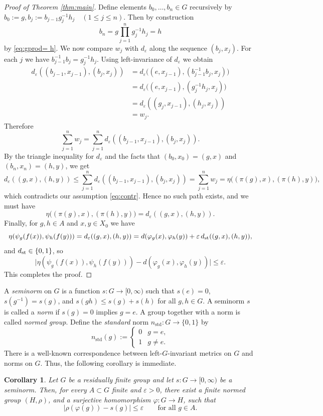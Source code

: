 \documentclass[11pt,a4paper]{amsproc}
\numberwithin{equation}{section}
\newtheorem{corollary}[theorem]{Corollary}
\theoremstyle{definition}
\begin{document}
\begin{proof}[Proof of Theorem \ref{thm:main}]
Define elements $b_0,\dots,b_n\in G$ recursively by
$b_0:=g, b_j := b_{j-1}g_j^{-1}h_j\quad (1\le j\le n).$ Then by construction
\[
b_n = g\prod_{j=1}^n g_j^{-1}h_j = h
\]
by \eqref{eq:gprod= h}. We now compare $w_j$ with $d_\varepsilon$ along the sequence $(b_j,x_j)$. For each $j$ we have
$b_{j-1}^{-1}b_j = g_j^{-1}h_j.$ Using left-invariance of $d_\varepsilon$ we obtain
\begin{align*}
d_\varepsilon((b_{j-1},x_{j-1}),(b_j,x_j))
&= d_\varepsilon\bigl((e,x_{j-1}),(b_{j-1}^{-1}b_j,x_j)\bigr)\\
&= d_\varepsilon\bigl((e,x_{j-1}),(g_j^{-1}h_j,x_j)\bigr)\\
&= d_\varepsilon((g_j,x_{j-1}),(h_j,x_j))\\
&= w_j.
\end{align*}
Therefore
\[
\sum_{j=1}^n w_j
= \sum_{j=1}^n d_\varepsilon((b_{j-1},x_{j-1}),(b_j,x_j)).
\]
By the triangle inequality for $d_\varepsilon$ and the facts that $(b_0,x_0)=(g,x)$ and $(b_n,x_n)=(h,y)$, we get
\[
d_\varepsilon((g,x),(h,y))
\le \sum_{j=1}^n d_\varepsilon((b_{j-1},x_{j-1}),(b_j,x_j))
= \sum_{j=1}^n w_j
= \eta\bigl((\pi(g),x),(\pi(h),y)\bigr),
\]
which contradicts our assumption \eqref{eq:contr}. Hence no such path exists, and we must have
\[
\eta\bigl((\pi(g),x),(\pi(h),y)\bigr)
= d_\varepsilon((g,x),(h,y)).
\]
Finally, for $g,h\in A$ and $x,y\in X_0$ we have
\[
\eta(\psi_g(f(x)),\psi_h(f(y)))
= d_\varepsilon((g,x),(h,y))
= d(\varphi_g(x),\varphi_h(y)) + \varepsilon\, d_{\rm st}((g,x),(h,y)),
\]
and $d_{\rm st}\in\{0,1\}$, so
\[
\bigl|\eta(\psi_g(f(x)),\psi_h(f(y))) - d(\varphi_g(x),\varphi_h(y))\bigr|
\le \varepsilon.
\]
This completes the proof.
\end{proof}

A \emph{seminorm} on $G$ is a function $s\colon G\to[0,\infty)$ such that
$s(e)=0$, $s(g^{-1})=s(g)$, and $s(gh)\le s(g)+s(h)$ for all $g,h\in G$. A seminorm $s$ is called a \emph{norm} if $s(g)=0$ implies $g=e$.  A group together with a norm is called \emph{normed group}.
Define the \emph{standard} norm $n_{\mathrm{std}}\colon G\to\{0,1\}$ by
\[
n_{\mathrm{std}}(g) :=
\begin{cases}
0 & g=e,\\
1 & g\neq e.
\end{cases}
\]
There is a well-known correspondence between left-$G$-invariant metrics on $G$ and norms on $G$. Thus, the following corollary is immediate.

\begin{corollary}
\label{thm:coro}
Let $G$ be a residually finite group and let $s\colon G\to[0,\infty)$ be a seminorm.
Then, for every $A \subset G$ finite and $\varepsilon>0$, there exist a finite normed group $(H,\rho)$, and a surjective homomorphism $\varphi\colon G\to H$,
such that
\[
|\rho(\varphi(g)) - s(g)| \le \varepsilon
\qquad\text{for all }g\in A.
\]
\end{corollary}
\end{document}
